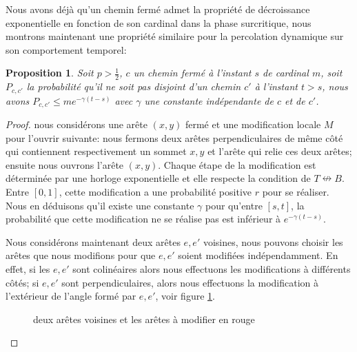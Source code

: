 \documentclass[titlepage,a4paper,12pt]{article}
\newcounter{prop}
\newtheorem{decexp}[prop]{Proposition}
\begin{document}
Nous avons déjà qu'un chemin fermé admet la propriété de décroissance exponentielle en fonction de son cardinal dans la phase surcritique, nous montrons maintenant une propriété similaire pour la percolation dynamique sur son comportement temporel: 

\begin{decexp}
Soit $p>\frac{1}{2}$, $c$ un chemin fermé à l'instant $s$ de cardinal $m$, soit $P_{c,c'}$ la probabilité qu'il ne soit pas disjoint d'un chemin $c'$ à l'instant $t>s$, nous avons $P_{c,c'}\leqslant me^{-\gamma(t-s)}$ avec $\gamma$ une constante indépendante de $c$ et de $c'$.
\end{decexp}
\begin{proof}
nous considérons une arête $(x,y)$ fermé et une modification locale $M$ pour l'ouvrir suivante: nous fermons deux arêtes perpendiculaires de même côté qui contiennent respectivement un sommet $x,y$ et l'arête qui relie ces deux arêtes; ensuite nous ouvrons l'arête $(x,y)$. Chaque étape de la modification est déterminée par une horloge exponentielle et elle respecte la condition de $T\nleftrightarrow B$. Entre $[0,1]$, cette modification a une probabilité positive $r$ pour se réaliser. Nous en déduisons qu'il existe une constante $\gamma$ pour qu'entre $[s,t]$, la probabilité que cette modification ne se réalise pas est inférieur à $e^{-\gamma(t-s)}$. 

Nous considérons maintenant deux arêtes $e,e'$ voisines, nous pouvons choisir les arêtes que nous modifions pour que $e,e'$ soient modifiées indépendamment. En effet, si les $e,e'$ sont colinéaires alors nous effectuons les modifications à différents côtés; si $e,e'$ sont perpendiculaires, alors nous effectuons la modification à l'extérieur de l'angle formé par $e,e'$, voir figure \ref{fig:mod}.

\begin{figure}[h]

\begin{minipage}{0.45\linewidth}
\center
{}
\end{minipage}
\hfill
\begin{minipage}{0.45\linewidth}
\center
{}
\end{minipage}
\caption{deux arêtes voisines et les arêtes à modifier en rouge}
\label{fig:mod}


\end{figure}
\end{proof}
\end{document}
